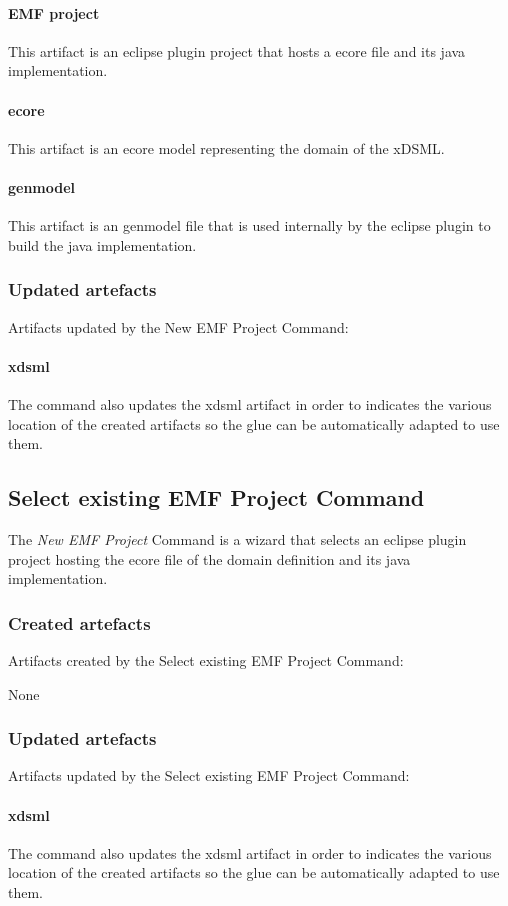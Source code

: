 \documentclass{gemoc} %
\begin{document}
\paragraph{EMF project} 
This artifact is an eclipse plugin project that hosts a ecore file and its java implementation.\paragraph{ecore} 
This artifact is an ecore model representing the domain of the xDSML.\paragraph{genmodel} 
This artifact is an genmodel file that is used internally by the eclipse plugin to build the java implementation.
\subsubsection{Updated artefacts}
Artifacts updated by the New EMF Project Command:
\paragraph{xdsml} 
The command also updates the xdsml artifact in order to indicates the various location of the created artifacts so the glue can be automatically adapted to use them.

\subsection{Select existing EMF Project Command}
The \emph{New EMF Project} Command is a wizard that selects an eclipse plugin project hosting the ecore file of the domain definition and its java implementation.
\subsubsection{Created artefacts}
Artifacts created by the Select existing EMF Project Command:

	None
\subsubsection{Updated artefacts}
Artifacts updated by the Select existing EMF Project Command:
\paragraph{xdsml} 
The command also updates the xdsml artifact in order to indicates the various location of the created artifacts so the glue can be automatically adapted to use them.
\end{document}
